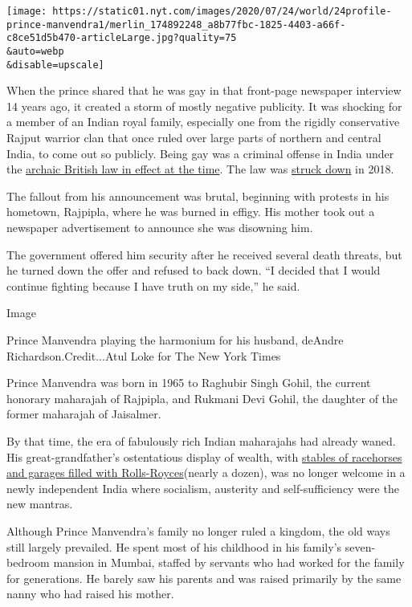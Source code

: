 \texttt{[image: https://static01.nyt.com/images/2020/07/24/world/24profile-prince-manvendra1/merlin\_174892248\_a8b77fbc-1825-4403-a66f-c8ce51d5b470-articleLarge.jpg?quality=75\\\&auto=webp\\\&disable=upscale]}

When the prince shared that he was gay in that front-page newspaper
interview 14 years ago, it created a storm of mostly negative publicity.
It was shocking for a member of an Indian royal family, especially one
from the rigidly conservative Rajput warrior clan that once ruled over
large parts of northern and central India, to come out so publicly.
Being gay was a criminal offense in India under the
\href{https://www.nytimes.com/2018/06/02/world/asia/gay-in-india-where-progress-has-come-only-with-risk.html?searchResultPosition=5}{archaic
British law in effect at the time}. The law was
\href{https://www.nytimes.com/2018/09/06/world/asia/india-gay-sex-377.html}{struck
down} in 2018.

The fallout from his announcement was brutal, beginning with protests in
his hometown, Rajpipla, where he was burned in effigy. His mother took
out a newspaper advertisement to announce she was disowning him.

The government offered him security after he received several death
threats, but he turned down the offer and refused to back down. ``I
decided that I would continue fighting because I have truth on my
side,'' he said.

Image

Prince Manvendra playing the harmonium for his husband, deAndre
Richardson.Credit...Atul Loke for The New York Times

Prince Manvendra was born in 1965 to Raghubir Singh Gohil, the current
honorary maharajah of Rajpipla, and Rukmani Devi Gohil, the daughter of
the former maharajah of Jaisalmer.

By that time, the era of fabulously rich Indian maharajahs had already
waned. His great-grandfather's ostentatious display of wealth, with
\href{https://economictimes.indiatimes.com/erstwhile-royals-rally-to-bring-back-vintage-rolls-royce-sold-overseas/articleshow/20608569.cms?from=mdr}{stables
of racehorses and garages filled with Rolls-Royces}(nearly a dozen), was
no longer welcome in a newly independent India where socialism,
austerity and self-sufficiency were the new mantras.

Although Prince Manvendra's family no longer ruled a kingdom, the old
ways still largely prevailed. He spent most of his childhood in his
family's seven-bedroom mansion in Mumbai, staffed by servants who had
worked for the family for generations. He barely saw his parents and was
raised primarily by the same nanny who had raised his mother.

